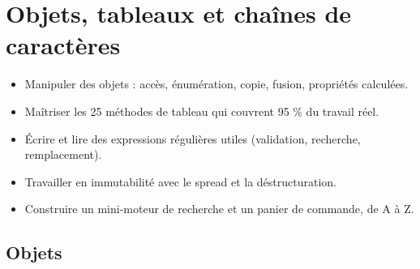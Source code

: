 \documentclass[12pt,a4paper,twoside,openright]{book}
\begin{document}
\chapter{Objets, tableaux et cha\^ines de caract\`eres}
\label{ch-js-struct}

\begin{objectif}
\begin{itemize}
  \item Manipuler des objets : acc\`es, \'enum\'eration, copie, fusion, propri\'et\'es calcul\'ees.
  \item Ma\^itriser les 25 m\'ethodes de tableau qui couvrent 95 \% du travail r\'eel.
  \item \'Ecrire et lire des expressions r\'eguli\`eres utiles (validation, recherche, remplacement).
  \item Travailler en immutabilit\'e avec le spread et la d\'estructuration.
  \item Construire un mini-moteur de recherche et un panier de commande, de A \`a Z.
\end{itemize}
\end{objectif}

\section{Objets}
\end{document}
